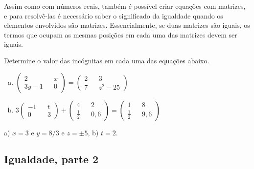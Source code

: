 \documentclass[main.tex]{subfiles}
\begin{document}
Assim como com números reais, também é possível criar equações com matrizes, e para resolvê-las  é necessário saber o significado da igualdade quando os elementos envolvidos são matrizes. Essencialmente, se duas matrizes são iguais, os termos que ocupam as mesmas posições em cada uma das matrizes devem ser iguais.

\begin{questao}
Determine o valor das incógnitas em cada uma das equações abaixo.
\begin{enumerate}[a)]
\item $\begin{pmatrix} 2 && x \\ 3y-1 && 0 \end{pmatrix} = \begin{pmatrix} 2 && 3 \\ 7 && z^2-25 \end{pmatrix}$
\item $ 3 \begin{pmatrix} -1 && t \\ 0 && 3 \end{pmatrix} + \begin{pmatrix} 4 && 2 \\ \frac{1}{2} && 0,6 \end{pmatrix} = \begin{pmatrix} 1 && 8 \\ \frac{1}{2} && 9,6 \end{pmatrix} $
\end{enumerate}
\end{questao}

\begin{gabarito}
	\begin{gabaritoQuestao}
		a) $x=3$ e $y=8/3$ e $z= \pm 5$, b) $t=2$.
	\end{gabaritoQuestao}
\end{gabarito}

\subsection*{Igualdade, parte 2}
\end{document}
